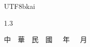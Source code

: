\begin{titlepage}
\begin{CJK*}{UTF8}{bkai}
\begin{spacing}{1.3}
\begin{center}
   \vfill   %

    中~~華~~民~~國~~\zhdigits{\yearZH}~年~~\zhdigits{\monthZH}~月\\
    \monthEN~\yearEN
     
     \end{center}
\end{spacing}
\end{CJK*}
\end{titlepage}



